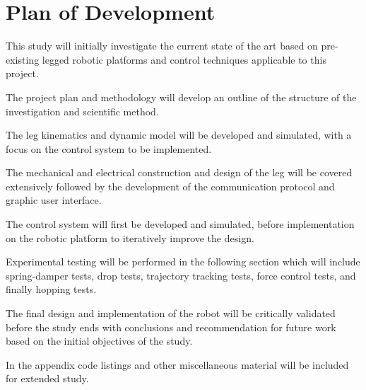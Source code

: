 \section{Plan of Development}
This study will initially investigate the current state of the art based on pre-existing legged robotic platforms and control techniques applicable to this project. 

The project plan and methodology will develop an outline of the structure of the investigation and scientific method.

The leg kinematics and dynamic model will be developed and simulated, with a focus on the control system to be implemented.

The mechanical and electrical construction and design of the leg will be covered extensively followed by the development of the communication protocol and graphic user interface. 

The control system will first be developed and simulated, before implementation on the robotic platform to iteratively improve the design.

Experimental testing will be performed in the following section which will include spring-damper tests, drop tests, trajectory tracking tests, force control tests, and finally hopping tests.

The final design and implementation of the robot will be critically validated before the study ends with conclusions  and recommendation for future work based on the initial objectives of the study.

In the appendix code listings and other miscellaneous material will be included for extended study.
